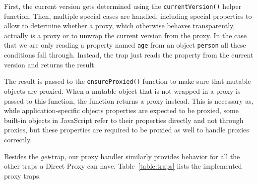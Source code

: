 First, the current version gets determined using the \lstinline{currentVersion()} helper function.
Then, multiple special cases are handled, including special properties to allow to determine whether a proxy, which otherwise behaves transparently, actually is a proxy or to unwrap the current version from the proxy.
In the case that we are only reading a property named \lstinline{age} from an object \lstinline{person} all these conditions fall through.
Instead, the trap just reads the property from the current version and returns the result.

The result is passed to the \lstinline{ensureProxied()} function to make sure that mutable objects are proxied.
When a mutable object that is not wrapped in a proxy is passed to this function, the function returns a proxy instead.
This is necessary as, while application-specific objects properties are expected to be proxied, some built-in objects in JavaScript refer to their properties directly and not through proxies, but these properties are required to be proxied as well to handle proxies correctly.

Besides the \emph{get}-trap, our proxy handler similarly provides behavior for all the other traps a Direct Proxy can have.
Table~\ref{table:traps} lists the implemented proxy traps.


